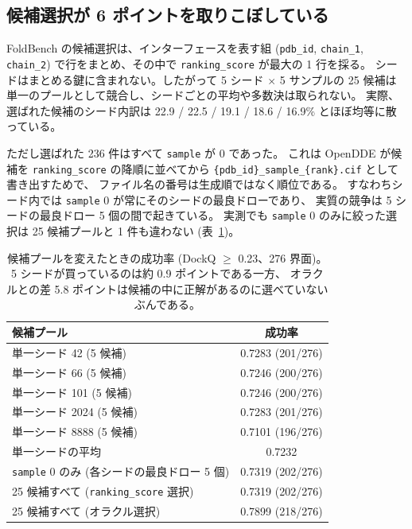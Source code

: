 \documentclass[11pt,a4paper]{article}
\begin{document}
\subsection{候補選択が 6 ポイントを取りこぼしている}
\label{sec:selection}

FoldBench の候補選択は、インターフェースを表す組 (\texttt{pdb\_id}, \texttt{chain\_1}, \texttt{chain\_2})
で行をまとめ、その中で \texttt{ranking\_score} が最大の 1 行を採る。
シードはまとめる鍵に含まれない。したがって 5 シード $\times$ 5 サンプルの 25 候補は
単一のプールとして競合し、シードごとの平均や多数決は取られない。
実際、選ばれた候補のシード内訳は 22.9 / 22.5 / 19.1 / 18.6 / 16.9\% とほぼ均等に散っている。

ただし選ばれた 236 件はすべて \texttt{sample} が 0 であった。
これは OpenDDE が候補を \texttt{ranking\_score} の降順に並べてから
\texttt{\{pdb\_id\}\_sample\_\{rank\}.cif} として書き出すためで、
ファイル名の番号は生成順ではなく順位である。
すなわちシード内では \texttt{sample} 0 が常にそのシードの最良ドローであり、
実質の競争は 5 シードの最良ドロー 5 個の間で起きている。
実測でも \texttt{sample} 0 のみに絞った選択は 25 候補プールと 1 件も違わない (表~\ref{tab:seeds})。

\begin{table}[htbp]
\centering
\caption{候補プールを変えたときの成功率 (DockQ $\geq$ 0.23、276 界面)。
5 シードが買っているのは約 0.9 ポイントである一方、
オラクルとの差 5.8 ポイントは候補の中に正解があるのに選べていないぶんである。}
\label{tab:seeds}
\begin{tabular}{lc}
\toprule
候補プール & 成功率 \\
\midrule
単一シード 42 (5 候補) & 0.7283 (201/276) \\
単一シード 66 (5 候補) & 0.7246 (200/276) \\
単一シード 101 (5 候補) & 0.7246 (200/276) \\
単一シード 2024 (5 候補) & 0.7283 (201/276) \\
単一シード 8888 (5 候補) & 0.7101 (196/276) \\
\midrule
単一シードの平均 & 0.7232 \\
\texttt{sample} 0 のみ (各シードの最良ドロー 5 個) & 0.7319 (202/276) \\
25 候補すべて (\texttt{ranking\_score} 選択) & 0.7319 (202/276) \\
25 候補すべて (オラクル選択) & 0.7899 (218/276) \\
\bottomrule
\end{tabular}
\end{table}
\end{document}
